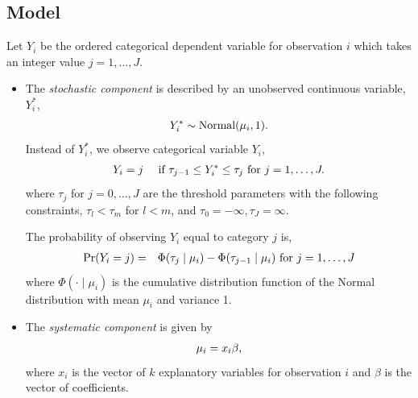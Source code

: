 \documentclass[letterpaper,10pt,english]{sphinxmanual}
\begin{document}
\subsection{Model}
\label{vignette:id86}
Let \(Y_{i}\) be the ordered categorical dependent variable for
observation \(i\) which takes an integer value
\(j=1, \ldots, J\).
\begin{itemize}
\item {} 
The \emph{stochastic component} is described by an unobserved continuous
variable, \(Y_i^*\),
\begin{gather}
\begin{split}\begin{aligned}
Y_{i}^*  \sim \textrm{Normal}(\mu_i, 1).\end{aligned}\end{split}\notag
\end{gather}
Instead of \(Y_i^*\), we observe categorical variable
\(Y_i\),
\begin{gather}
\begin{split}\begin{aligned}
Y_i = j \quad \textrm{ if } \tau_{j-1} \le Y_i^* \le \tau_j \textrm{
for } j=1,\ldots, J.\end{aligned}\end{split}\notag
\end{gather}
where \(\tau_j\) for \(j=0,\ldots, J\) are the threshold
parameters with the following constraints, \(\tau_l < \tau_m\)
for \(l < m\), and \(\tau_0=-\infty, \tau_J=\infty\).

The probability of observing \(Y_i\) equal to category \(j\)
is,
\begin{gather}
\begin{split}\begin{aligned}
\Pr(Y_i=j) &=& \Phi(\tau_j \mid \mu_i)-\Phi(\tau_{j-1} \mid \mu_i)
\textrm{ for } j=1,\ldots, J\end{aligned}\end{split}\notag
\end{gather}
where \(\Phi(\cdot \mid \mu_i)\) is the cumulative distribution
function of the Normal distribution with mean \(\mu_i\) and
variance 1.

\item {} 
The \emph{systematic component} is given by
\begin{gather}
\begin{split}\begin{aligned}
\mu_{i}= x_i \beta,\end{aligned}\end{split}\notag
\end{gather}
where \(x_{i}\) is the vector of \(k\) explanatory variables
for observation \(i\) and \(\beta\) is the vector of
coefficients.


\end{itemize}
\end{document}
